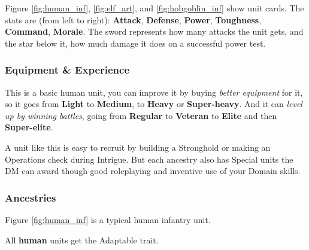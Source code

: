 \documentclass[letterpaper,twocolumn,openany,nodeprecatedcode]{dndbook}
\begin{document}
Figure \ref{fig:human_inf}, \ref{fig:elf_art}, and \ref{fig:hobgoblin_inf} show unit cards.
The stats are (from left to right): \textbf{Attack}, \textbf{Defense}, \textbf{Power}, \textbf{Toughness}, \textbf{Command}, \textbf{Morale}. The sword represents how many attacks the unit gets, and the star below it, how much damage it does on a successful power test.

\subsubsection{Equipment \& Experience}

This is a basic human unit, you can improve it by buying \textit{better equipment} for it, so it goes from \textbf{Light} to \textbf{Medium}, to \textbf{Heavy} or \textbf{Super-heavy}. And it can \textit{level up by winning battles}, going from \textbf{Regular} to \textbf{Veteran} to \textbf{Elite} and then \textbf{Super-elite}.

A unit like this is easy to recruit by building a Stronghold or making an Operations check during Intrigue. But each ancestry also has Special units the DM can award though good roleplaying and inventive use of your Domain skills.





\subsubsection{Ancestries}


Figure \ref{fig:human_inf} is a typical human infantry unit.

All \textbf{human} units get the Adaptable trait.
\end{document}
